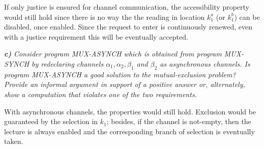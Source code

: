 \documentclass[12pt]{article}
\begin{document}
If only justice is ensured for channel communication, the accessibility property would still hold since there is no way the the reading in location $k^{a}_{1}$ (or $k^{b}_{1}$) can be disabled, once enabled. Since the request to enter is continuously renewed, even with a justice requirement this will be eventually accepted.

\medskip
\textit{\textbf{c)} Consider program MUX-ASYNCH which is obtained from program MUX-SYNCH by redeclaring channels $\alpha_1,\alpha_2,\beta_1$ and $\beta_2$ as asynchronous channels. Is program MUX-ASYNCH a good solution to the mutual-exclusion problem? Provide an informal argument in support of a positive answer or, alternately, show a computation that violates one of the two requirements.}

With asynchronous channels, the properties would still hold. Exclusion would be guaranteed by the selection in $k_1$; besides, if the channel is not-empty, then the lecture is always enabled and the corresponding branch of selection is eventually taken.
\end{document}
